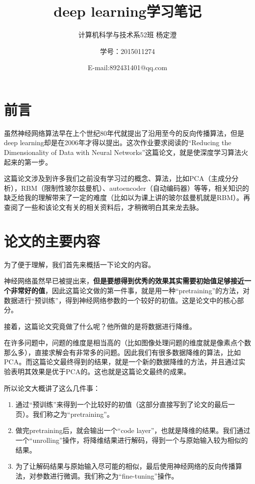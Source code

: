 \documentclass{ctexart}
\begin{document}
\title{deep learning学习笔记}
\author{计算机科学与技术系52班 杨定澄 \and 学号：2015011274 \and E-mail:892431401@qq.com}
\date{}
\maketitle
\section{前言}
虽然神经网络算法早在上个世纪80年代就提出了沿用至今的反向传播算法，但是deep learning却是在2006年才得以提出。这次作业要求阅读的“Reducing the Dimensionality of Data with Neural Networks”这篇论文，就是使深度学习算法火起来的第一步。

这篇论文涉及到许多我们之前没有学习过的概念、算法，比如PCA（主成分分析），RBM（限制性玻尔兹曼机）、autoencoder（自动编码器）等等，相关知识的缺乏给我的理解带来了一定的难度（比如以为课上讲的玻尔兹曼机就是RBM）。再查阅了一些和该论文有关的相关资料后，才稍微明白其来龙去脉。
\section{论文的主要内容}
为了便于理解，我们首先来概括一下论文的内容。

神经网络虽然早已被提出来，\textbf{但是要想得到优秀的效果其实需要初始值足够接近一个非常好的值}，因此这篇论文做的第一件事，就是用一种“pretraining”的方法，对数据进行“预训练”，得到神经网络参数的一个较好的初值。这是论文中的核心部分。

接着，这篇论文究竟做了什么呢？他所做的是将数据进行降维。

在许多问题中，问题的维度是相当高的（比如图像处理问题的维度就是像素点个数那么多），直接求解会有非常多的问题。因此我们有很多数据降维的算法，比如PCA。而这篇论文最终得到的结果，就是一个新的数据降维的方法，并且通过实验表明其效果是优于PCA的。这也就是这篇论文最终的成果。

所以论文大概讲了这么几件事：

\begin{enumerate}
\item
通过“预训练”来得到一个比较好的初值（这部分直接写到了论文的最后一页）。我们称之为“pretraining”。
\item
做完pretraining后，就会输出一个“code layer”，也就是降维的结果。我们通过一个“unrolling”操作，将降维结果进行解码，得到一个与原始输入较为相似的结果。
\item
为了让解码结果与原始输入尽可能的相似，最后使用神经网络的反向传播算法，对参数进行微调。我们称之为“fine-tuning”操作。
\end{enumerate}
\end{document}
